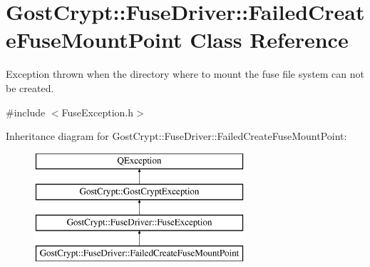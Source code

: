 \hypertarget{class_gost_crypt_1_1_fuse_driver_1_1_failed_create_fuse_mount_point}{}\section{Gost\+Crypt\+:\+:Fuse\+Driver\+:\+:Failed\+Create\+Fuse\+Mount\+Point Class Reference}
\label{class_gost_crypt_1_1_fuse_driver_1_1_failed_create_fuse_mount_point}


Exception thrown when the directory where to mount the fuse file system can not be created.  




{\ttfamily \#include $<$Fuse\+Exception.\+h$>$}

Inheritance diagram for Gost\+Crypt\+:\+:Fuse\+Driver\+:\+:Failed\+Create\+Fuse\+Mount\+Point\+:\begin{figure}[H]
\begin{center}
\leavevmode
\includegraphics[height=4.000000cm]{class_gost_crypt_1_1_fuse_driver_1_1_failed_create_fuse_mount_point}
\end{center}
\end{figure}
